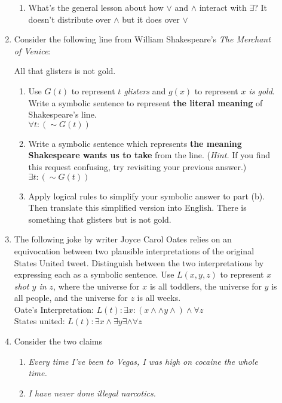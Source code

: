 \documentclass{letter}
\theoremstyle{definition}
\begin{document}
\begin{description}
\begin{enumerate}
\begin{enumerate}
			\item What's the general lesson about how $\vee$ and $\wedge$ interact with $\exists$? It doesn't distribute over $\wedge$ but it does over $\vee$
		\end{enumerate}
		\item Consider the following line from William Shakespeare's {\em The Merchant of Venice}:
			\begin{center}{All that glisters is not gold.}\end{center}
			\begin{enumerate}
				\item Use $G(t)$ to represent {\em $t$ glisters} and $g(x)$ to represent {\em $x$ is gold}. Write a symbolic sentence to represent {\bfseries the literal meaning} of Shakespeare's line. \\$\forall t:(\sim G(t))$
				\item Write a symbolic sentence which represents {\bfseries the meaning Shakespeare wants us to take} from the line. ({\em Hint.} If you find this request confusing, try revisiting your previous answer.)\\ $ \exists t:(\sim G(t))$
				\item Apply logical rules to simplify your symbolic answer to part (b). Then translate this simplified version into English. There is something that glisters but is not gold.\\
			\end{enumerate}
		\item The following joke by writer Joyce Carol Oates relies on an equivocation between two plausible interpretations of the original States United tweet. Distinguish between the two interpretations by expressing each as a symbolic sentence. Use $L(x,y,z)$ to represent {\em $x$ shot $y$ in $z$}, where the universe for $x$ is all toddlers, the universe for $y$ is all people, and the universe for $z$ is all weeks. \\
Oate's Interpretation: $L(t): \exists x: ( x \wedge \wedge y \wedge) \wedge \forall z$ \\
States united: $L(t): \exists x \wedge \exists y \exists \wedge \forall z $
		\item Consider the two claims
			\begin{enumerate}[(1)]
				\item {\em Every time I've been to Vegas, I was high on cocaine the whole time.}
				\item {\em I have never done illegal narcotics.}
			\end{enumerate}

\end{enumerate}
\end{description}
\end{document}
